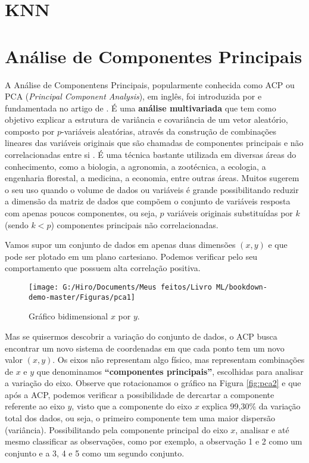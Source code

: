 \documentclass[
]{book}
\begin{document}
\hypertarget{knn}{%
\section{KNN}\label{knn}}

\hypertarget{AC}{%
\section{Análise de Componentes Principais}\label{AC}}

A Análise de Componentens Principais, popularmente conhecida como ACP ou PCA (\emph{Principal Component Analysis}), em inglês, foi introduzida por \citet{pearson1901liii} e fundamentada no artigo de \citet{hotelling1933analysis}. É uma \textbf{análise multivariada} que tem como objetivo explicar a estrutura de variância e covariância de um vetor aleatório, composto por \(p\)-variáveis aleatórias, através da construção de combinações lineares das variáveis originais que são chamadas de componentes principais e não correlacionadas entre si \citep{mingoti2007analise}. É uma técnica bastante utilizada em diversas áreas do conhecimento, como a biologia, a agronomia, a zootécnica, a ecologia, a engenharia florestal, a medicina, a economia, entre outras áreas. Muitos sugerem o seu uso quando o volume de dados ou variáveis é grande possibilitando reduzir a dimensão da matriz de dados que compõem o conjunto de variáveis resposta com apenas poucos componentes, ou seja, \(p\) variáveis originais substituídas por \(k\) (sendo \(k < p\)) componentes principais não correlacionadas.

Vamos supor um conjunto de dados em apenas duas dimensões \((x, y)\) e que pode ser plotado em um plano cartesiano. Podemos verificar pelo seu comportamento que possuem alta correlação positiva.

\begin{figure}

{\centering \texttt{[image: G:/Hiro/Documents/Meus feitos/Livro ML/bookdown-demo-master/Figuras/pca1]} 

}

\caption{Gráfico bidimensional \(x\) por \(y\).}\label{fig:pca1}
\end{figure}



Mas se quisermos descobrir a variação do conjunto de dados, o ACP busca encontrar um novo sistema de coordenadas em que cada ponto tem um novo valor \((x, y)\). Os eixos não representam algo físico, mas representam combinações de \(x\) e \(y\) que denominamos \textbf{``componentes principais''}, escolhidas para analisar a variação do eixo. Observe que rotacionamos o gráfico na Figura \ref{fig:pca2} e que após a ACP, podemos verificar a possibilidade de dercartar a componente referente ao eixo \(y\), visto que a componente do eixo \(x\) explica 99,30\% da variação total dos dados, ou seja, o primeiro componente tem uma maior dispersão (variância). Possibilitando pela componente principal do eixo \(x\), analisar e até mesmo classificar as observações, como por exemplo, a observação 1 e 2 como um conjunto e a 3, 4 e 5 como um segundo conjunto.
\end{document}
